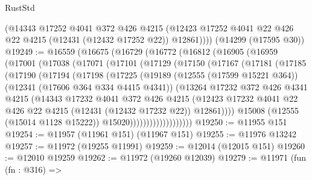 \begin{lexlean}{RustStd}
\begin{coremodule}
        (@14343
          @17252
          @4041
          @372
          @426
          @4215
          (@12423 @17252 @4041 @22 @426 @22 @4215 (@12431 (@12432 @17252 @22)) @12861))))
    (@14299 (@17595 @30))
@19249 := @16559
    (@16675
      (@16729
        (@16772
          (@16812
            (@16905
              (@16959
                (@17001
                  (@17038
                    (@17071
                      (@17101
                        (@17129
                          (@17150
                            (@17167
                              (@17181
                                (@17185
                                  (@17190
                                    (@17194
                                      (@17198
                                        (@17225
                                          (@19189
                                            (@12555 (@17599 @15221 @364))
                                            (@12341 (@17606 @364 @334 @4415 @4341))
                                            (@13264
                                              @17232
                                              @372
                                              @426
                                              @4341
                                              @4215
                                              (@14343
                                                @17232
                                                @4041
                                                @372
                                                @426
                                                @4215
                                                (@12423
                                                  @17232
                                                  @4041
                                                  @22
                                                  @426
                                                  @22
                                                  @4215
                                                  (@12431 (@12432 @17232 @22))
                                                  @12861))))
                                          @15008
                                          (@12555 (@15014 @1128 @15222))
                                          @15020)))))))))))))))))))
@19250 := @11955 @151
@19254 := @11957 (@11961 @151) (@11967 @151)
@19255 := @11976 @13242
@19257 := @11972 (@19255 @11991)
@19259 := @12014 (@12015 @151)
@19260 := @12010 @19259
@19262 := @11972 (@19260 @12039)
@19279 := @11971
    (fun (fn : @316) =>

\end{coremodule}
\end{lexlean}
